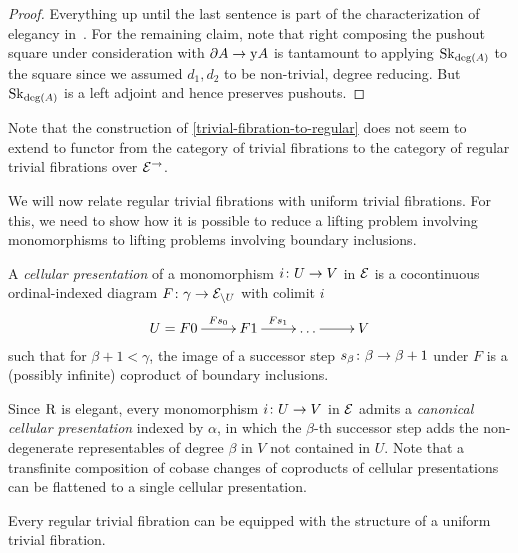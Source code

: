 \documentclass[reqno,10pt,a4paper,oneside,draft]{amsart}
\begin{document}
\begin{proof}
Everything up until the last sentence is part of the characterization of elegancy in~\cite[Proposition~3.8]{bergner-rezk-elegant}.
For the remaining claim, note that right composing the pushout square under consideration with $\partial A \to \mathrm{y} A$ is tantamount to applying $\operatorname{Sk}_{\deg(A)}$ to the square since we assumed $d_1, d_2$ to be non-trivial, \ie degree reducing.
But $\operatorname{Sk}_{\deg(A)}$ is a left adjoint and hence preserves pushouts.
\end{proof}

Note that the construction of \cref{trivial-fibration-to-regular} does not seem to extend to functor from the category of trivial fibrations to the category of regular trivial fibrations over $\mathcal{E}^{\to}$.

\medskip

We will now relate regular trivial fibrations with uniform trivial fibrations.
For this, we need to show how it is possible to reduce a lifting problem involving monomorphisms to lifting problems involving boundary inclusions.

\begin{definition} A \emph{cellular presentation} of a monomorphism $i \colon U \to V$ in $\mathcal{E}$ is a cocontinuous ordinal-indexed diagram $F \colon \gamma \to \mathcal{E}_{\backslash U}$ with colimit $i$
\[
\xymatrix{
  U = F 0
  \ar[r]^-{F s_0}
&
  F 1
  \ar[r]^{F s_1}
&
  \ldots
  \ar[r]
&
  V
}
\]
such that for $\beta + 1 < \gamma$, the image of a successor step $s_{\beta} \colon \beta \to \beta + 1$ under $F$ is a (possibly infinite) coproduct of boundary inclusions.
\end{definition}

Since $\mathrm{R}$ is elegant, every monomorphism $i \colon U \to V$ in $\mathcal{E}$ admits a \emph{canonical cellular presentation} indexed by $\alpha$, in which the $\beta$-th successor step adds the non-degenerate representables of degree $\beta$ in $V$ not contained in $U$.
Note that a transfinite composition of cobase changes of coproducts of cellular presentations can be flattened to a single cellular presentation.

\begin{proposition} \label{regular-trivial-fibration-to-uniform}
Every regular trivial fibration can be equipped with the structure of a uniform trivial fibration.
\end{proposition}
\end{document}
